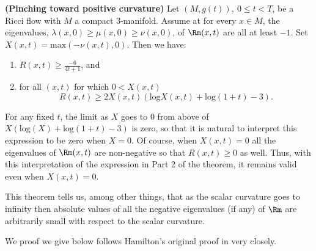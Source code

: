 \begin{theorem}
\label{thm:pinching-toward-positive-curvature}
\label{pinch}{\bf (Pinching toward positive curvature)}
Let $(M,g(t)),\ 0\le t<T$, be a Ricci flow with $M$ a compact
$3$-manifold. Assume at for every $x\in M$, the eigenvalues,
$\lambda(x,0)\geq\mu(x,0)\geq\nu(x,0)$, of $\Rm(x,t)$ are all
at least $-1$. Set $X(x,t)=\mathrm{max}(-\nu(x,t),0)$. Then we have:
\begin{enumerate}
\item $R(x,t)\ge \frac{-6}{4t+1}$, and
\item for all $(x,t)$ for which $0<X(x,t)$
$$R(x,t)\geq 2X(x,t)\left(\mathrm{log}X(x,t)+\mathrm{log}(1+t)-3\right).$$
\end{enumerate}
\end{theorem}

For any fixed $t$, the limit as $X$ goes to $0$ from above of
$X(\mathrm{log}(X)+\mathrm{log}(1+t)-3)$ is zero, so that it is natural to
interpret this expression to be zero when $X=0$. Of course, when
$X(x,t)=0$ all the eigenvalues of $\Rm(x,t)$ are non-negative
so that $R(x,t)\ge 0$ as well. Thus, with this interpretation of the
expression in Part 2 of the theorem, it remains valid even when
$X(x,t)=0$.

\begin{remark}
\label{rem:pinching-negative-eigenvalues-small}
This theorem tells us, among other things, that as the scalar
curvature goes to infinity  then  absolute values of all the
negative eigenvalues (if any) of $\Rm$ are  arbitrarily small
with respect to the scalar curvature.
\end{remark}


We proof we give below follows Hamilton's original proof in
\cite{HamiltonNSRF3M} very closely.

